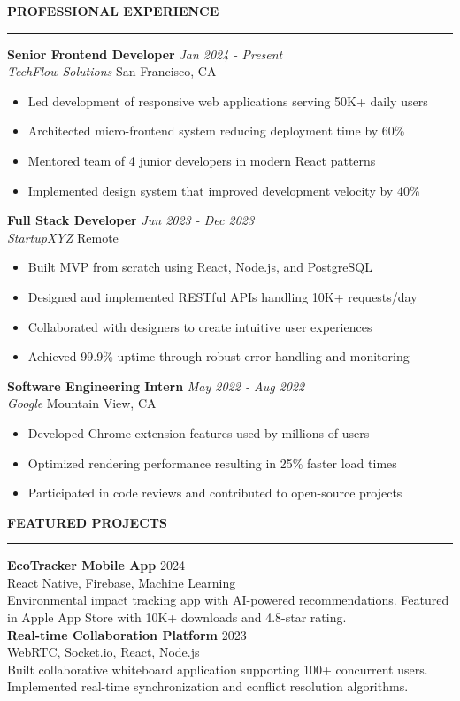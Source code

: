 \documentclass[a4paper,10pt]{article}
\newcommand{\cvsection}[1]{
    \vspace{10pt}
    {\color{primary}\Large\bfseries #1}
    \vspace{5pt}
    \hrule
    \vspace{10pt}
}
\newcommand{\cvsubsection}[4]{
    \textbf{\color{primary}#1} \hfill {\color{secondary}\textit{#2}} \\
    {\color{accent}\textit{#3}} \hfill {\color{secondary}#4} \\
    \vspace{5pt}
}
\newcommand{\cvitem}[1]{
    \item #1
}
\begin{document}
\hfill
\begin{minipage}[t]{0.6\textwidth}

\cvsection{PROFESSIONAL EXPERIENCE}

\cvsubsection{Senior Frontend Developer}{Jan 2024 - Present}{TechFlow Solutions}{San Francisco, CA}
\begin{itemize}[leftmargin=15pt]
    \cvitem{Led development of responsive web applications serving 50K+ daily users}
    \cvitem{Architected micro-frontend system reducing deployment time by 60\%}
    \cvitem{Mentored team of 4 junior developers in modern React patterns}
    \cvitem{Implemented design system that improved development velocity by 40\%}
\end{itemize}

\cvsubsection{Full Stack Developer}{Jun 2023 - Dec 2023}{StartupXYZ}{Remote}
\begin{itemize}[leftmargin=15pt]
    \cvitem{Built MVP from scratch using React, Node.js, and PostgreSQL}
    \cvitem{Designed and implemented RESTful APIs handling 10K+ requests/day}
    \cvitem{Collaborated with designers to create intuitive user experiences}
    \cvitem{Achieved 99.9\% uptime through robust error handling and monitoring}
\end{itemize}

\cvsubsection{Software Engineering Intern}{May 2022 - Aug 2022}{Google}{Mountain View, CA}
\begin{itemize}[leftmargin=15pt]
    \cvitem{Developed Chrome extension features used by millions of users}
    \cvitem{Optimized rendering performance resulting in 25\% faster load times}
    \cvitem{Participated in code reviews and contributed to open-source projects}
\end{itemize}

\cvsection{FEATURED PROJECTS}

\textbf{\color{primary}EcoTracker Mobile App} \hfill {\color{secondary}2024}\\
{\color{accent}React Native, Firebase, Machine Learning}\\
Environmental impact tracking app with AI-powered recommendations. Featured in Apple App Store with 10K+ downloads and 4.8-star rating.\\

\textbf{\color{primary}Real-time Collaboration Platform} \hfill {\color{secondary}2023}\\
{\color{accent}WebRTC, Socket.io, React, Node.js}\\
Built collaborative whiteboard application supporting 100+ concurrent users. Implemented real-time synchronization and conflict resolution algorithms.\\


\end{minipage}
\end{document}
